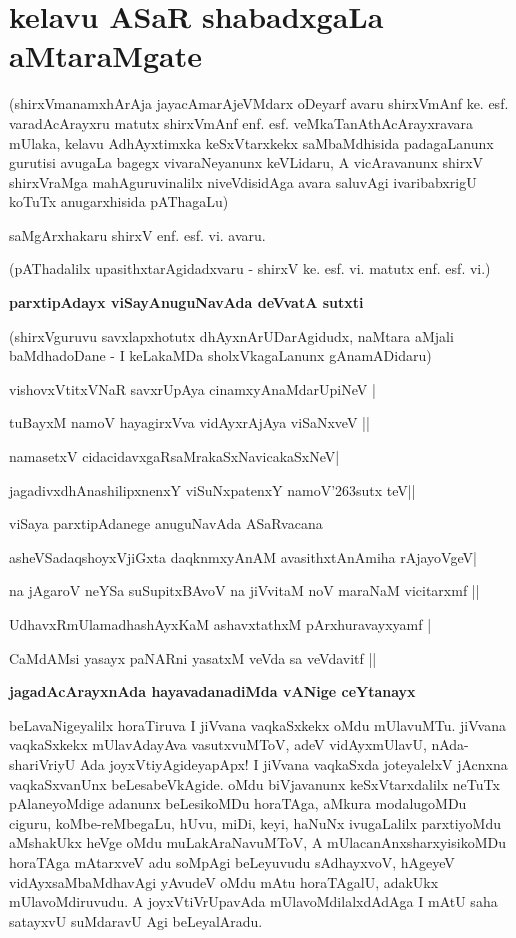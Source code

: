 \setcounter{chapter}{3}
\chapter{kelavu ASaR shabadxgaLa aMtaraMgate}

(shirxVmanamxhArAja jayacAmarAjeVMdarx oDeyarf avaru shirxVmAnf ke. esf. varadAcArayxru matutx shirxVmAnf enf. esf. veMkaTanAthAcArayxravara mUlaka, kelavu AdhAyxtimxka keSxVtarxkekx saMbaMdhisida padagaLanunx gurutisi avugaLa bagegx vivaraNeyanunx keVLidaru, A vicAravanunx shirxV shirxVraMga mahAguruvinalilx niveVdisidAga avara saluvAgi ivaribabxrigU koTuTx anugarxhisida pAThagaLu)

saMgArxhakaru shirxV enf. esf. vi. avaru.

(pAThadalilx upasithxtarAgidadxvaru - shirxV ke. esf. vi. matutx enf. esf. vi.)

{\bf{parxtipAdayx viSayAnuguNavAda deVvatA sutxti}}

(shirxVguruvu savxlapxhotutx dhAyxnArUDarAgidudx, naMtara aMjali baMdhadoDane - I keLakaMDa sholxVkagaLanunx gAnamADidaru)

\begin{description}
\item[(1)] vishovxVtitxVNaR savxrUpAya cinamxyAnaMdarUpiNeV |
\item  tuBayxM namoV hayagirxVva vidAyxrAjAya viSaNxveV ||
\item[(2)] namasetxV cidacidavxgaRsaMrakaSxNavicakaSxNeV|
\item  jagadivxdhAnashilipxnenxY viSuNxpatenxY namoV\char'263sutx teV||
\end{description}

viSaya parxtipAdanege anuguNavAda ASaRvacana
\begin{description}
\item[(3)] asheVSadaqshoyxVjiGxta daqknmxyAnAM avasithxtAnAmiha rAjayoVgeV|
\item  na jAgaroV neYSa suSupitxBAvoV na jiVvitaM noV maraNaM vicitarxmf ||
\item[(4)] UdhavxRmUlamadhashAyxKaM ashavxtathxM pArxhuravayxyamf |
\item  CaMdAMsi yasayx paNARni yasatxM veVda sa veVdavitf ||
\end{description}

{\bf jagadAcArayxnAda hayavadanadiMda vANige ceYtanayx}

beLavaNigeyalilx horaTiruva I jiVvana vaqkaSxkekx oMdu mUlavuMTu. jiVvana vaqkaSxkekx mUlavAdayAva vasutxvuMToV, adeV vidAyxmUlavU, nAda-shariVriyU Ada joyxVtiyAgideyapApx! I jiVvana vaqkaSxda joteyalelxV jAcnxna vaqkaSxvanUnx beLesabeVkAgide. oMdu biVjavanunx keSxVtarxdalilx neTuTx pAlaneyoMdige adanunx beLesikoMDu horaTAga, aMkura modalugoMDu ciguru, koMbe-reMbegaLu, hUvu, miDi, keyi, haNuNx ivugaLalilx parxtiyoMdu aMshakUkx heVge oMdu muLakAraNavuMToV, A mUlacanAnxsharxyisikoMDu horaTAga mAtarxveV adu soMpAgi beLeyuvudu sAdhayxvoV, hAgeyeV vidAyxsaMbaMdhavAgi yAvudeV oMdu mAtu horaTAgalU, adakUkx mUlavoMdiruvudu. A joyxVtiVrUpavAda mUlavoMdilalxdAdAga I mAtU saha satayxvU suMdaravU Agi beLeyalAradu.

